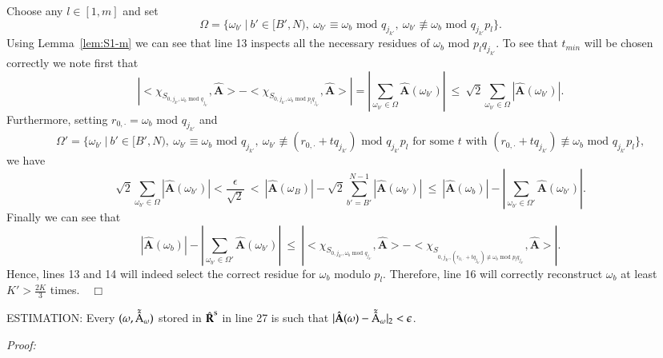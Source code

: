 \documentclass{article}
\begin{document}
Choose any $l \in [1,m]$ and set 
$$\Omega = \big\{ \omega_{b'}~\big|~b' \in [B',N),~\omega_{b'} \equiv \omega_{b} \textrm{ mod } q_{j_{k'}},~\omega_{b'} \nequiv \omega_{b} \textrm{ mod } q_{j_{k'}}p_{l}  \big\}.$$  
Using Lemma~\ref{lem:S1-m} we can see that line 13 inspects all the necessary residues of $\omega_{b}$ mod $p_{l}q_{j_{k'}}$.  To see that $t_{min}$ will be chosen correctly we note first that
$$\left| <\chi_{S_{0,j_{k'},\omega_{b} \textrm{ mod } q_{j_{k'}}}},\hat{\textbf{A}}> - <\chi_{S_{0,j_{k'},\omega_{b} \textrm{ mod } p_{l}q_{j_{k'}}}},\hat{\textbf{A}}> \right| = \left| \sum_{ \omega_{b'} \in \Omega} \hat{\textbf{A}}(\omega_{b'}) \right| ~\leq~\sqrt{2} \sum_{\omega_{b'} \in \Omega} | \hat{\textbf{A}}(\omega_{b'}) |.$$ 
Furthermore, setting $r_{0,\cdot} = \omega_{b}$ mod $q_{j_{k'}}$ and
$$\Omega ' = \big\{ \omega_{b'}~\big|~b' \in [B',N),~\omega_{b'} \equiv \omega_{b} \textrm{ mod } q_{j_{k'}},~\omega_{b'} \nequiv (r_{0,\cdot} + tq_{j_{k'}}) \textrm{ mod } q_{j_{k'}}p_{l} \textrm{ for some } t \textrm{ with } (r_{0,\cdot} + tq_{j_{k'}}) \nequiv \omega_{b} \textrm{ mod } q_{j_{k'}}p_{l} \big\},$$ 
we have
$$\sqrt{2} \sum_{\omega_{b'} \in \Omega} | \hat{\textbf{A}}(\omega_{b'}) | < \frac{\epsilon}{\sqrt{2}}~<~ |\hat{\textbf{A}}(\omega_{B})| - \sqrt{2} \sum^{N-1}_{b'=B'} |\hat{\textbf{A}}(\omega_{b'})|~\leq~|\hat{\textbf{A}}(\omega_{b})| - \left| \sum_{\omega_{b'} \in \Omega ' } \hat{\textbf{A}}(\omega_{b'}) \right|.$$
Finally we can see that 
$$ |\hat{\textbf{A}}(\omega_{b})| - \left| \sum_{\omega_{b'} \in \Omega '} \hat{\textbf{A}}(\omega_{b'}) \right| ~\leq~ \left| <\chi_{S_{0,j_{k'},\omega_{b} \textrm{ mod } q_{j_{k'}}}},\hat{\textbf{A}}> - <\chi_{S_{0,j_{k'},(r_{0,\cdot} + tq_{j_{k'}}) \nequiv \omega_{b} \textrm{ mod } p_{l}q_{j_{k'}}}},\hat{\textbf{A}}> \right|.$$
Hence, lines 13 and 14 will indeed select the correct residue for $\omega_{b}$ modulo $p_{l}$.  Therefore, line 16 will correctly reconstruct $\omega_{b}$ at least $K' > \frac{2K}{3}$ times.~~$\Box$ \\

\begin{Lemma}
ESTIMATION:  Every $(\omega, \tilde{\hat{{\rm A}}}_{\omega})$ stored in $\hat{\textbf{R}}^{\rm s}$ in line 27 is such that $|\hat{\textbf{A}}(\omega) - \tilde{\hat{{\rm A}}}_{\omega}|_{2} < \epsilon$.
\label{lem:estimation}
\end{Lemma}

\noindent \textit{Proof:} \\
\end{document}
